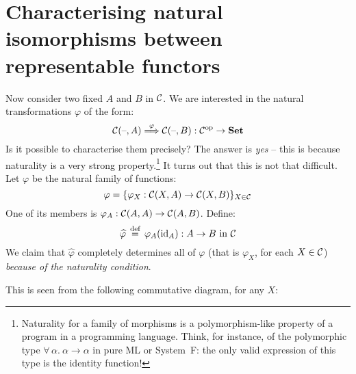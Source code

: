 \section{Characterising natural isomorphisms between representable functors}

Now consider two fixed $A$ and $B$ in $\mathcal{C}$. We are interested in the
natural transformations $\varphi$ of the form:
\[ 
  \mathcal{C}(\text{--}, A) \overset{\varphi}{\Longrightarrow} \mathcal{C}(\text{--}, B) 
  : {\mathcal{C}}^{\mathrm{op}} \to \mathbf {Set} 
\]
Is it possible to characterise them precisely? The answer is \emph{yes} --
this is because naturality is a very strong property.\footnote{Naturality for
  a family of morphisms is a polymorphism-like property of a program in a
  programming language. Think, for instance, of the polymorphic type
  $\forall\, \alpha.\ \alpha \to \alpha$ in pure ML or System~F: the only
  valid expression of this type is the identity function!} 
It turns out that this is not that difficult. Let $\varphi$ be the natural
family of functions:
\[ 
  \varphi 
  = 
  \{ \varphi_X: \mathcal{C} (X, A) \to \mathcal{C} (X, B) \}_{X \in \mathcal{C}} 
\]
One of its members is $\varphi_A: \mathcal{C} (A, A) \to \mathcal{C} (A, B)$.
Define: 
\[ 
  \widehat{\varphi} 
  \,\stackrel{\text{def}}{=}\, 
  \varphi_A (\mathrm{id}_{ A }) : A \to B \text{ in } \mathcal{C} 
\]
We claim that $\widehat{\varphi}$ completely determines all of $\varphi$ (that
is $\varphi_X$, for each $X\in\mathcal{C}$) 
\emph{because of the naturality condition}.

This is seen from the following commutative diagram, for any $X$:

\begin{center}
\end{center}

